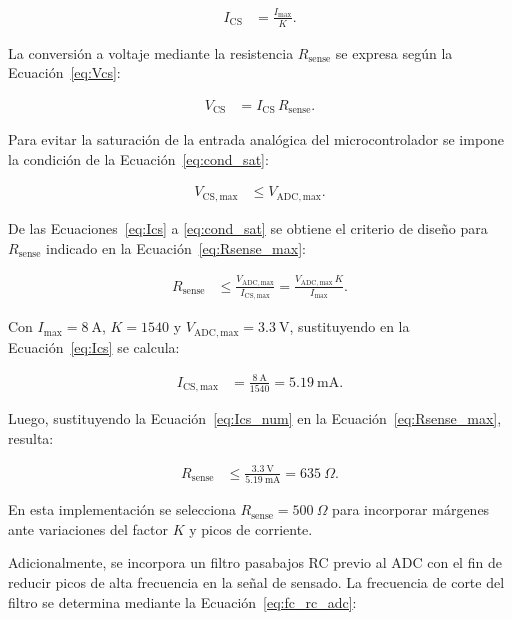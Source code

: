 \begin{align}
I_{\mathrm{CS}}&=\frac{I_{\max}}{K}.
\label{eq:Ics}
\end{align}

La conversión a voltaje mediante la resistencia \(R_{\mathrm{sense}}\) se expresa según la Ecuación~\ref{eq:Vcs}:

\begin{align}
V_{\mathrm{CS}}&=I_{\mathrm{CS}}\,R_{\mathrm{sense}}.
\label{eq:Vcs}
\end{align}

Para evitar la saturación de la entrada analógica del microcontrolador se impone la condición de la Ecuación~\ref{eq:cond_sat}:

\begin{align}
V_{\mathrm{CS,max}}&\leq V_{\mathrm{ADC,max}}.
\label{eq:cond_sat}
\end{align}

De las Ecuaciones~\ref{eq:Ics} a \ref{eq:cond_sat} se obtiene el criterio de diseño para \(R_{\mathrm{sense}}\) indicado en la Ecuación~\ref{eq:Rsense_max}:

\begin{align}
R_{\mathrm{sense}}
&\leq \frac{V_{\mathrm{ADC,max}}}{I_{\mathrm{CS,max}}}
= \frac{V_{\mathrm{ADC,max}}\,K}{I_{\max}}.
\label{eq:Rsense_max}
\end{align}

Con \(I_{\max}=8~\mathrm{A}\), \(K=1540\) y \(V_{\mathrm{ADC,max}}=3.3~\mathrm{V}\), sustituyendo en la Ecuación~\ref{eq:Ics} se calcula:

\begin{align}
I_{\mathrm{CS,max}}&=\frac{8~\mathrm{A}}{1540}=5.19~\mathrm{mA}.
\label{eq:Ics_num}
\end{align}

Luego, sustituyendo la Ecuación~\ref{eq:Ics_num} en la Ecuación~\ref{eq:Rsense_max}, resulta:

\begin{align}
R_{\mathrm{sense}}
&\leq \frac{3.3~\mathrm{V}}{5.19~\mathrm{mA}}
= 635~\Omega.
\label{eq:Rsense_num}
\end{align}

En esta implementación se selecciona \(R_{\mathrm{sense}}=500~\Omega\) para incorporar márgenes ante variaciones del factor \(K\) y picos de corriente.

Adicionalmente, se incorpora un filtro pasabajos RC previo al ADC con el fin de reducir picos de alta frecuencia en la señal de sensado. La frecuencia de corte del filtro se determina mediante la Ecuación~\ref{eq:fc_rc_adc}:

